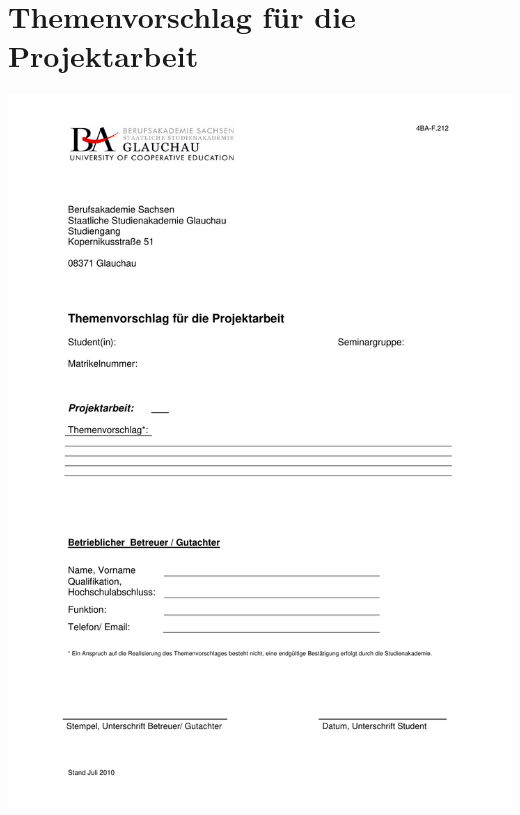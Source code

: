 \chapter{Themenvorschlag für die Projektarbeit}
\label{anhang-themenvorschlag-projekt}
\includegraphics[scale=0.8]{Anhang/4BA-F.212_Themenvorschlag_für_die_Projektarbeit_ausfüllbar.pdf}
\clearpage

